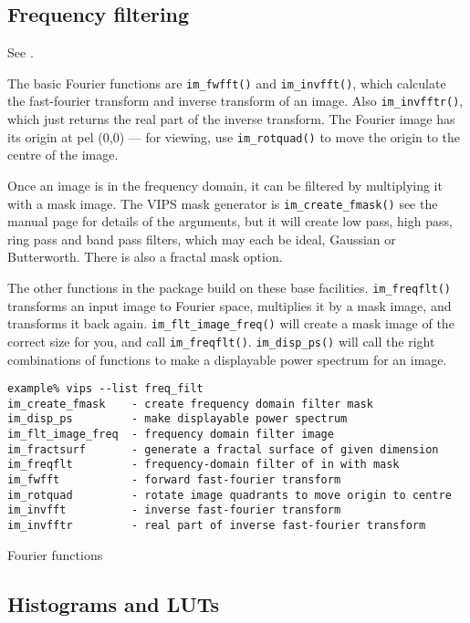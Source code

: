\subsection{Frequency filtering}

See .

The basic Fourier functions are \verb+im_fwfft()+ and
\verb+im_invfft()+, which calculate the fast-fourier transform and inverse
transform of an image. Also \verb+im_invfftr()+, which just returns the real
part of the inverse transform.
The Fourier image has its origin at pel (0,0) ---
for viewing, use \verb+im_rotquad()+ to move the origin to the centre of
the image.

Once an image is in the frequency domain, it can be filtered by multiplying
it with a mask image. The VIPS mask generator is \verb+im_create_fmask()+
see the manual page for details of the arguments, but it will create low
pass, high pass, ring pass and band pass filters, which may each be ideal,
Gaussian or Butterworth. There is also a fractal mask option.

The other functions in the package build on these base
facilities. \verb+im_freqflt()+ transforms an input image to
Fourier space, multiplies it by a mask image, and transforms it back
again. \verb+im_flt_image_freq()+ will create a mask image of the correct
size for you, and call \verb+im_freqflt()+.  \verb+im_disp_ps()+ will call
the right combinations of functions to make a displayable power spectrum
for an image.

\begin{fig2}
\begin{verbatim}
example% vips --list freq_filt    
im_create_fmask    - create frequency domain filter mask
im_disp_ps         - make displayable power spectrum
im_flt_image_freq  - frequency domain filter image
im_fractsurf       - generate a fractal surface of given dimension
im_freqflt         - frequency-domain filter of in with mask
im_fwfft           - forward fast-fourier transform
im_rotquad         - rotate image quadrants to move origin to centre
im_invfft          - inverse fast-fourier transform
im_invfftr         - real part of inverse fast-fourier transform
\end{verbatim}
\caption{Fourier functions}
\label{fg:freq}
\end{fig2}

\subsection{Histograms and LUTs}

